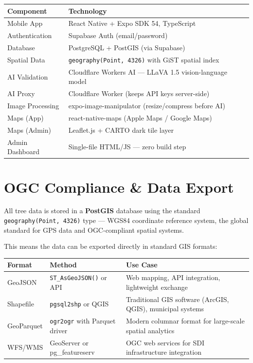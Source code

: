 \documentclass[11pt,a4paper]{article}
\newcommand{\proposalTableStart}{\arrayrulecolor{black}}
\newcommand{\proposalTableHeader}{}
\newcommand{\proposalTableEnd}{\arrayrulecolor{black}}
\begin{document}
\begin{center}
\proposalTableStart
\begin{tabularx}{\textwidth}{|>{\raggedright\arraybackslash}p{}|Y|}
\hline
\proposalTableHeader
\textbf{Component} & \textbf{Technology} \\
\hline
Mobile App & React Native + Expo SDK 54, TypeScript \\
\hline
Authentication & Supabase Auth (email/password) \\
\hline
Database & PostgreSQL + PostGIS (via Supabase) \\
\hline
Spatial Data & \texttt{geography(Point, 4326)} with GiST spatial index \\
\hline
AI Validation & Cloudflare Workers AI --- LLaVA 1.5 vision-language model \\
\hline
AI Proxy & Cloudflare Worker (keeps API keys server-side) \\
\hline
Image Processing & expo-image-manipulator (resize/compress before AI) \\
\hline
Maps (App) & react-native-maps (Apple Maps / Google Maps) \\
\hline
Maps (Admin) & Leaflet.js + CARTO dark tile layer \\
\hline
Admin Dashboard & Single-file HTML/JS --- zero build step \\
\hline
\end{tabularx}
\proposalTableEnd
\end{center}

\clearpage
\section{OGC Compliance \& Data Export}

All tree data is stored in a \textbf{PostGIS} database using the standard \texttt{geography(Point, 4326)} type --- WGS84 coordinate reference system, the global standard for GPS data and OGC-compliant spatial systems.

This means the data can be exported directly in standard GIS formats:

\begin{center}
\proposalTableStart
\begin{tabularx}{\textwidth}{|>{\raggedright\arraybackslash}p{}|>{\raggedright\arraybackslash}p{}|Y|}
\hline
\proposalTableHeader
\textbf{Format} & \textbf{Method} & \textbf{Use Case} \\
\hline
GeoJSON & \texttt{ST\_AsGeoJSON()} or API & Web mapping, API integration, lightweight exchange \\
\hline
Shapefile & \texttt{pgsql2shp} or QGIS & Traditional GIS software (ArcGIS, QGIS), municipal systems \\
\hline
GeoParquet & \texttt{ogr2ogr} with Parquet driver & Modern columnar format for large-scale spatial analytics \\
\hline
WFS/WMS & GeoServer or pg\_featureserv & OGC web services for SDI infrastructure integration \\
\hline
\end{tabularx}
\proposalTableEnd
\end{center}
\end{document}
